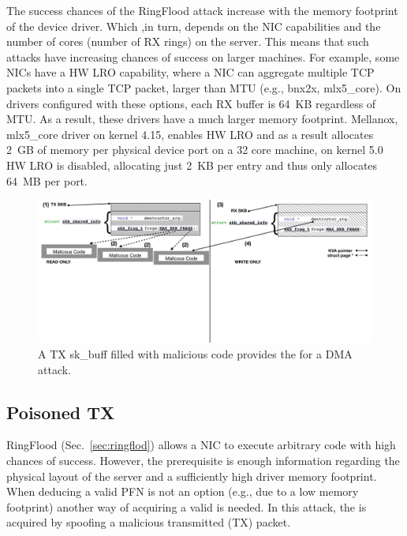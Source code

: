 The success chances of the RingFlood attack increase with the memory footprint of the device driver. Which ,in turn, depends on the NIC capabilities and the number of cores (number of RX rings) on the server. This means that such attacks have increasing chances of success on larger machines. 
For example, some NICs have a HW LRO capability\cite{mlx5_lro}, where a NIC can aggregate multiple TCP packets into a single TCP packet, larger than MTU (e.g., bnx2x, mlx5\_core). On drivers configured with these options, each RX buffer is 64~KB regardless of MTU. As a result, these drivers have a much larger memory footprint. Mellanox, mlx5\_core driver on kernel 4.15, enables HW LRO and as a result allocates 2~GB of memory per physical device port on a 32 core machine, on kernel 5.0 HW LRO is disabled, allocating just 2~KB per entry and thus only allocates 64~MB per port.

\begin{figure}[t]
    \centering
    \includegraphics[width=0.8\linewidth]{figs/accomplice.pdf}
    \caption{A TX sk\_buff filled with malicious code provides the \kva for a DMA attack.}
    \label{fig:payload}
\end{figure}
\subsection{Poisoned TX}\label{sec:posion}

RingFlood (Sec.~\ref{sec:ringflod}) allows a NIC to execute arbitrary code with high chances of success. However, the prerequisite is enough information regarding the physical layout of the server and a sufficiently high driver memory footprint. When deducing a valid PFN is not an option (e.g., due to a low memory footprint) another way of acquiring a valid \kva{} is needed.
%
In this attack, the \kva is acquired by spoofing a malicious transmitted (TX) packet.

